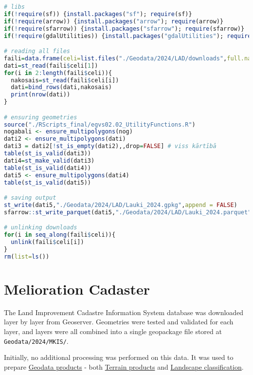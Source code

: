 \documentclass[
]{book}
\newcommand{\passthrough}[1]{#1}
\begin{document}
\begin{lstlisting}[language=R]
# libs
if(!require(sf)) {install.packages("sf"); require(sf)}
if(!require(arrow)) {install.packages("arrow"); require(arrow)}
if(!require(sfarrow)) {install.packages("sfarrow"); require(sfarrow)}
if(!require(gdalUtilities)) {install.packages("gdalUtilities"); require(gdalUtilities)}

# reading all files
faili=data.frame(celi=list.files("./Geodata/2024/LAD/downloads",full.names = TRUE))
dati=st_read(faili$celi[1])
for(i in 2:length(faili$celi)){
  nakosais=st_read(faili$celi[i])
  dati=bind_rows(dati,nakosais)
  print(nrow(dati))
}

# ensuring geometries
source("./RScripts_final/egvs02.02_UtilityFunctions.R")
nogabali <- ensure_multipolygons(nog)
dati2 <- ensure_multipolygons(dati)
dati3 = dati2[!st_is_empty(dati2),,drop=FALSE] # viss kārtībā
table(st_is_valid(dati3)) 
dati4=st_make_valid(dati3)
table(st_is_valid(dati4))
dati5 <- ensure_multipolygons(dati4)
table(st_is_valid(dati5))

# saving output
st_write(dati5,"./Geodata/2024/LAD/Lauki_2024.gpkg",append = FALSE)
sfarrow::st_write_parquet(dati5,"./Geodata/2024/LAD/Lauki_2024.parquet")

# unlinking downloads
for(i in seq_along(faili$celi)){
  unlink(faili$celi[i])
}
rm(list=ls())
\end{lstlisting}

\section{Melioration Cadaster}\label{Ch04.03}

The Land Improvement Cadastre Information System database was downloaded layer
by layer from Geoserver. Geometries were tested and validated for each layer, and
layers were all combined into a single geopackage file stored at \passthrough{\lstinline!Geodata/2024/MKIS/!}.

Initially, no additional processing was performed on this data. It was used to
prepare \hyperref[Ch05]{Geodata products} - both \hyperref[Ch05.01]{Terrain products} and \hyperref[Ch05.03]{Landscape classification}.
\end{document}

